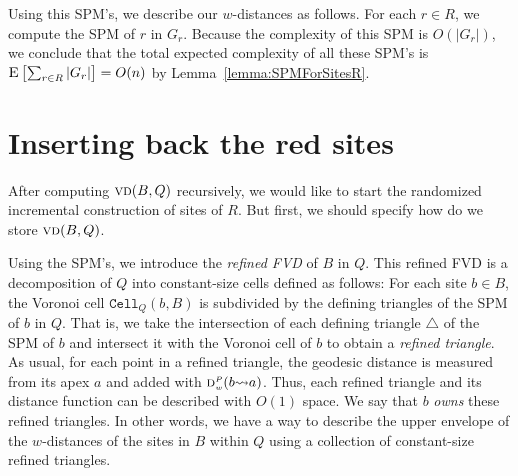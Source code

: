 \documentclass[a4paper,UKenglish]{socg-lipics-v2018}
\newcommand{\s}{\mathcal S}
\newcommand{\dd}[3][P]{\ensuremath{\textsc{d}_{\scriptscriptstyle w}^{\scriptscriptstyle #1}(#2 {\leadsto} #3)}}
\newcommand{\p}[3][P]{\ensuremath{\pi_{_{#1}}(#2, #3)}}
\newcommand{\cell}[2][P]{\ensuremath{\mathtt{Cell}_{\scriptscriptstyle #1}(#2)}}
\newcommand{\vd}[2][P]{\textsc{vd}(#2, #1)}
\newcommand{\ex}[1]{\textsc{E}\left[#1\right]}
\begin{document}
Using this SPM's, we describe our $w$-distances as follows.
For each $r\in R$, we compute the SPM of $r$ in $G_r$.
Because the complexity of this SPM is $O(|G_r|)$, we conclude that the total expected complexity of all these SPM's is $\ex{\sum_{r\in R} |G_r|} = O(n)$ by Lemma~\ref{lemma:SPMForSitesR}.


\section{Inserting back the red sites}\label{section: Insertion process}

After computing $\vd[Q]{B}$ recursively, we would like to start the randomized incremental construction of sites of $R$. 
But first, we should specify how do we store $\vd[Q]{B}$. 


Using the SPM's, we introduce the \emph{refined FVD} of $B$ in $Q$.
This refined FVD is a decomposition of $Q$ into constant-size cells defined as follows:
For each site $b\in B$, the Voronoi cell $\cell[Q]{b, B}$ is subdivided by the defining triangles of the SPM of $b$ in $Q$. 
That is, we take the intersection of each defining triangle $\triangle$ of the SPM of $b$ and intersect it with the Voronoi cell of $b$ to obtain a \emph{refined triangle}. 
As usual, for each point in a refined triangle, the geodesic distance is measured from its apex $a$ and added with $\dd{b}{a}$. 
Thus, each refined triangle and its distance function can be described with $O(1)$ space. We say that $b$ \emph{owns} these refined triangles. 
In other words, we have a way to describe the upper envelope of the $w$-distances of the sites in $B$ within $Q$ using a collection of constant-size refined triangles. 
\end{document}
